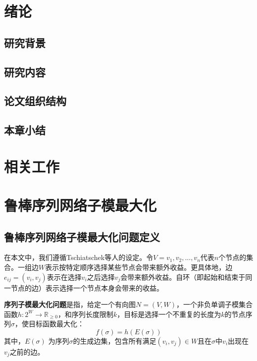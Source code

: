 \chapter{绪论}

\section{研究背景}
\section{研究内容}
\section{论文组织结构}
\section{本章小结}

\chapter{相关工作}

\chapter{鲁棒序列网络子模最大化}

\section{鲁棒序列网络子模最大化问题定义}
在本文中，我们遵循Tschiatschek等人\cite{tschiatschek2017selecting}的设定。令$V={v_1,v_2,...,v_n}$代表$n$个节点的集合。一组边\(W\)表示按特定顺序选择某些节点会带来额外收益。更具体地，边\(e_{ij} = (v_i,v_j)\)表示在选择\(v_i\)之后选择\(v_j\)会带来额外收益。自环（即起始和结束于同一节点的边）表示选择一个节点本身会带来的收益。

\begin{definition}
{\bfseries 序列子模最大化问题}是指，给定一个有向图\(N = (V,W)\)，一个非负单调子模集合函数\(h: 2^W \rightarrow \mathbb{R}_{\ge 0}\)，和序列长度限制\(k\)，目标是选择一个不重复的长度为\(k\)的节点序列\(\sigma\)，使目标函数最大化：
\begin{equation}
    f(\sigma)=h(E(\sigma))
\end{equation}
\noindent 其中，\(E(\sigma)\) 为序列$\sigma$的生成边集，包含所有满足\((v_i,v_j)\in W\)且在\(\sigma\)中\(v_i\)出现在\(v_j\)之前的边。
\end{definition}

